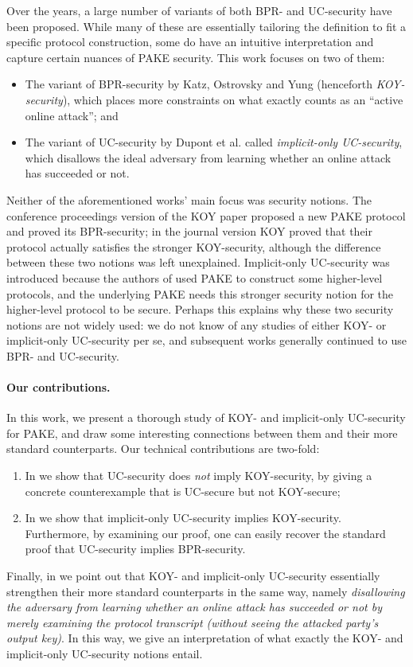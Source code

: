 \documentclass{article}
\begin{document}
Over the years, a large number of variants of both BPR- and UC-security have been proposed. While many of these are essentially tailoring the definition to fit a specific protocol construction, some do have an intuitive interpretation and capture certain nuances of PAKE security. This work focuses on two of them:
\begin{itemize}
  \item The variant of BPR-security by Katz, Ostrovsky and Yung \cite{JACM:KatOstYun09} (henceforth \emph{KOY-security}), which places more constraints on what exactly counts as an ``active online attack''; and
  \item The variant of UC-security by Dupont et al. \cite{EC:DHPRY18} called \emph{implicit-only UC-security}, which disallows the ideal adversary from learning whether an online attack has succeeded or not.
\end{itemize}
Neither of the aforementioned works' main focus was security notions. The conference proceedings version of the KOY paper \cite{EC:KatOstYun01} proposed a new PAKE protocol and proved its BPR-security; in the journal version \cite{JACM:KatOstYun09} KOY proved that their protocol actually satisfies the stronger KOY-security, although the difference between these two notions was left unexplained. Implicit-only UC-security was introduced because the authors of \cite{EC:DHPRY18} used PAKE to construct some higher-level protocols, and the underlying PAKE needs this stronger security notion for the higher-level protocol to be secure. Perhaps this explains why these two security notions are not widely used: we do not know of any studies of either KOY- or implicit-only UC-security per se, and subsequent works generally continued to use BPR- and UC-security.

\paragraph{Our contributions.}
In this work, we present a thorough study of KOY- and implicit-only UC-security for PAKE, and draw some interesting connections between them and their more standard counterparts. Our technical contributions are two-fold:
\begin{enumerate}
  \item In  we show that UC-security does \emph{not} imply KOY-security, by giving a concrete counterexample that is UC-secure but not KOY-secure;
  \item In  we show that implicit-only UC-security implies KOY-security. Furthermore, by examining our proof, one can easily recover the standard proof that UC-security implies BPR-security.
\end{enumerate}
Finally, in  we point out that KOY- and implicit-only UC-security essentially strengthen their more standard counterparts in the same way, namely \emph{disallowing the adversary from learning whether an online attack has succeeded or not by merely examining the protocol transcript (without seeing the attacked party's output key)}. In this way, we give an interpretation of what exactly the KOY- and implicit-only UC-security notions entail.
\end{document}
